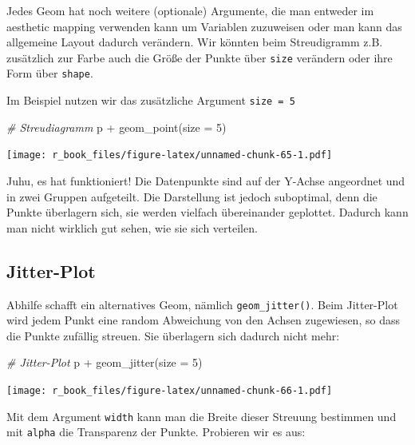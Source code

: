 \documentclass[
]{book}
\newenvironment{Shaded}{\begin{snugshade}}{\end{snugshade}}
\newcommand{\AttributeTok}[1]{\textcolor[rgb]{0.77,0.63,0.00}{#1}}
\newcommand{\CommentTok}[1]{\textcolor[rgb]{0.56,0.35,0.01}{\textit{#1}}}
\newcommand{\DecValTok}[1]{\textcolor[rgb]{0.00,0.00,0.81}{#1}}
\newcommand{\FunctionTok}[1]{\textcolor[rgb]{0.00,0.00,0.00}{#1}}
\newcommand{\NormalTok}[1]{#1}
\newcommand{\SpecialCharTok}[1]{\textcolor[rgb]{0.00,0.00,0.00}{#1}}
\begin{document}
Jedes Geom hat noch weitere (optionale) Argumente, die man entweder im aesthetic mapping verwenden kann um Variablen zuzuweisen oder man kann das allgemeine Layout dadurch verändern. Wir könnten beim Streudigramm z.B. zusätzlich zur Farbe auch die Größe der Punkte über \texttt{size} verändern oder ihre Form über \texttt{shape}.

Im Beispiel nutzen wir das zusätzliche Argument \texttt{size\ =\ 5}

\begin{Shaded}
\begin{Highlighting}[]
\CommentTok{\# Streudiagramm}
\NormalTok{p }\SpecialCharTok{+} \FunctionTok{geom\_point}\NormalTok{(}\AttributeTok{size =} \DecValTok{5}\NormalTok{)}
\end{Highlighting}
\end{Shaded}

\texttt{[image: r\_book\_files/figure-latex/unnamed-chunk-65-1.pdf]}

Juhu, es hat funktioniert! Die Datenpunkte sind auf der Y-Achse angeordnet und in zwei Gruppen aufgeteilt. Die Darstellung ist jedoch suboptimal, denn die Punkte überlagern sich, sie werden vielfach übereinander geplottet. Dadurch kann man nicht wirklich gut sehen, wie sie sich verteilen.

\hypertarget{jitter-plot}{%
\subsection{Jitter-Plot}\label{jitter-plot}}

Abhilfe schafft ein alternatives Geom, nämlich \texttt{geom\_jitter()}. Beim Jitter-Plot wird jedem Punkt eine random Abweichung von den Achsen zugewiesen, so dass die Punkte zufällig streuen. Sie überlagern sich dadurch nicht mehr:

\begin{Shaded}
\begin{Highlighting}[]
\CommentTok{\# Jitter{-}Plot}
\NormalTok{p }\SpecialCharTok{+} \FunctionTok{geom\_jitter}\NormalTok{(}\AttributeTok{size =} \DecValTok{5}\NormalTok{)}
\end{Highlighting}
\end{Shaded}

\texttt{[image: r\_book\_files/figure-latex/unnamed-chunk-66-1.pdf]}

Mit dem Argument \texttt{width} kann man die Breite dieser Streuung bestimmen und mit \texttt{alpha} die Transparenz der Punkte. Probieren wir es aus:
\end{document}
